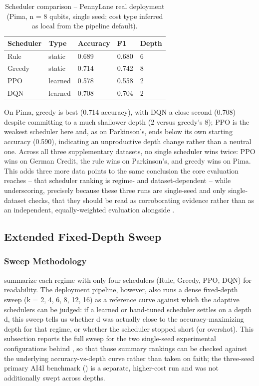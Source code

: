 \begin{table}[htbp]
\centering
\caption{Scheduler comparison -- PennyLane real deployment (Pima, n = 8 qubits, single seed; cost type inferred as local from the pipeline default).}
\label{tab:pima}
\begin{tabular}{|p{3cm}|p{2cm}|p{2.3cm}|p{2cm}|p{2.5cm}|}
\hline
\textbf{Scheduler} & \textbf{Type} & \textbf{Accuracy} & \textbf{F1} & \textbf{Depth} \\
\hline
Rule & static & 0.689 & 0.680 & 6 \\
Greedy & static & 0.714 & 0.742 & 8 \\
PPO & learned & 0.578 & 0.558 & 2 \\
DQN & learned & 0.708 & 0.704 & 2 \\
\hline
\end{tabular}
\end{table}

On Pima, greedy is best (0.714 accuracy), with DQN a close second (0.708) despite committing to a much shallower depth (2 versus greedy's 8); PPO is the weakest scheduler here and, as on Parkinson's, ends below its own starting accuracy (0.590), indicating an unproductive depth change rather than a neutral one. Across all three supplementary datasets, no single scheduler wins twice: PPO wins on German Credit, the rule wins on Parkinson's, and greedy wins on Pima. This adds three more data points to the same conclusion the core evaluation reaches -- that scheduler ranking is regime- and dataset-dependent -- while underscoring, precisely because these three runs are single-seed and only single-dataset checks, that they should be read as corroborating evidence rather than as an independent, equally-weighted evaluation alongside .

\subsection{Extended Fixed-Depth Sweep}

\subsubsection{Sweep Methodology}
 summarize each regime with only four schedulers (Rule, Greedy, PPO, DQN) for readability. The deployment pipeline, however, also runs a dense fixed-depth sweep (k = 2, 4, 6, 8, 12, 16) as a reference curve against which the adaptive schedulers can be judged: if a learned or hand-tuned scheduler settles on a depth d, this sweep tells us whether d was actually close to the accuracy-maximizing depth for that regime, or whether the scheduler stopped short (or overshot). This subsection reports the full sweep for the two single-seed experimental configurations behind , so that those summary rankings can be checked against the underlying accuracy-vs-depth curve rather than taken on faith; the three-seed primary AI4I benchmark () is a separate, higher-cost run and was not additionally swept across depths.


